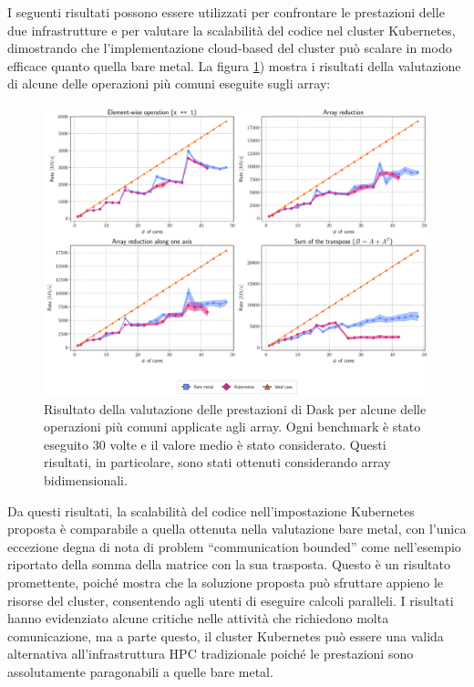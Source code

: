 I seguenti risultati possono essere utilizzati per confrontare le prestazioni
delle due infrastrutture e per valutare la scalabilità del codice nel
cluster Kubernetes, dimostrando che l'implementazione cloud-based
del cluster può scalare in modo efficace quanto quella bare metal.
La figura \ref{fig:summary-dask_it}) mostra i risultati della
valutazione di alcune delle operazioni più comuni eseguite sugli array:



\begin{figure}
  \centering
  \includegraphics[width=\textwidth]{img/abstract/summary-dask}
  \caption{Risultato della valutazione delle prestazioni di Dask per alcune
    delle operazioni più comuni applicate agli array.
    Ogni benchmark è stato eseguito 30 volte e il valore medio è stato
    considerato.
    Questi risultati, in particolare, sono stati ottenuti considerando array
    bidimensionali.}
  \label{fig:summary-dask_it}
\end{figure}

Da questi risultati, la scalabilità del codice nell'impostazione Kubernetes proposta è
comparabile a quella ottenuta nella valutazione bare metal, con l'unica
eccezione degna di nota di problem ``communication bounded'' come nell'esempio
riportato della somma della matrice con la sua trasposta.
Questo è un risultato promettente, poiché mostra che la soluzione proposta può
sfruttare appieno le risorse del cluster, consentendo agli utenti di eseguire
calcoli paralleli.
I risultati hanno evidenziato alcune critiche nelle attività che richiedono molta
comunicazione, ma a parte questo, il cluster Kubernetes può essere una valida
alternativa all'infrastruttura HPC tradizionale poiché le prestazioni sono
assolutamente paragonabili a quelle bare metal.


